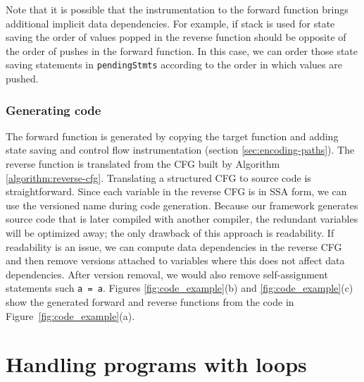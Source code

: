 \documentclass[12pt]{gatech-thesis}
\begin{document}
Note that it is possible that the instrumentation to the forward function brings additional implicit data dependencies. 
For example, if stack is used for state saving the order of values popped in the reverse function should be opposite of the order of pushes in the forward function. 
In this case, we can order those state saving statements in \texttt{pendingStmts} according to the order in which values are pushed.


\subsubsection{Generating code} 
The forward function is generated by copying the target function and adding state saving and control flow instrumentation (section \ref{sec:encoding-paths}). 
The reverse function is translated from the CFG built by Algorithm \ref{algorithm:reverse-cfg}. 
Translating a structured CFG to source code is straightforward. 
Since each variable in the reverse CFG is in SSA form, we can use the versioned name during code generation. 
Because our framework generates source code that is later compiled with another compiler, the redundant variables will be optimized away; the only drawback of this approach is readability.
If readability is an issue, we can compute data dependencies in the reverse CFG and then remove versions attached to variables where this does not affect data dependencies.
After version removal, we would also remove self-assignment statements such \texttt{a = a}.
Figures \ref{fig:code_example}(b) and \ref{fig:code_example}(c) show the generated forward and reverse functions from the code in Figure~\ref{fig:code_example}(a).








\section{Handling programs with loops}


\newcommand{\naive}{na\"ive\xspace}
\newcommand{\Program}{\ensuremath{P}\xspace}
\newcommand{\Forward}{\ensuremath{\Program^{+}}\xspace}
\newcommand{\Inverse}{\ensuremath{\Program^{-}}\xspace}
\newcommand{\Input}{\ensuremath{I}\xspace}
\newcommand{\Output}{\ensuremath{O}\xspace}
\newcommand{\ExtraOuts}{\ensuremath{S}\xspace}
\newcommand{\OutsS}{\ensuremath{\Outs+\ExtraOuts}\xspace}
\newcommand{\Var}{\ensuremath{v}\xspace}
\newcommand{\Vars}{\ensuremath{V}\xspace}
\newcommand{\Exec}[4]{\ensuremath{{#1}\{{#2}={#3}\} \rightarrow \{{#2}={#4}\}}\xspace}
\end{document}
